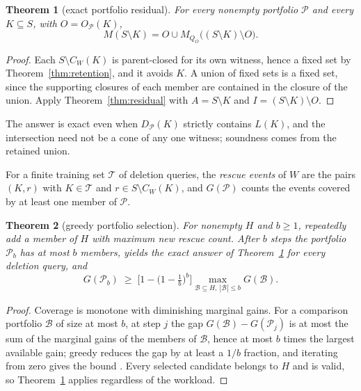 \documentclass[11pt,a4paper]{article}
\theoremstyle{plain}
\newtheorem{theorem}{Theorem}[section]
\theoremstyle{definition}
\theoremstyle{remark}
\begin{document}
\begin{theorem}[exact portfolio residual]\label{thm:portfolio}
For every nonempty portfolio $\mathcal P$ and every $K\subseteq S$, with $O=O_{\mathcal P}(K)$,
\[
M(S\setminus K)=O\cup M_{Q_O}\big((S\setminus K)\setminus O\big).
\]
\end{theorem}

\begin{proof}
Each $S\setminus C_W(K)$ is parent-closed for its own witness, hence a fixed set by Theorem~\ref{thm:retention}, and it avoids $K$. A union of fixed sets is a fixed set, since the supporting closures of each member are contained in the closure of the union. Apply Theorem~\ref{thm:residual} with $A=S\setminus K$ and $I=(S\setminus K)\setminus O$.
\end{proof}

The answer is exact even when $D_{\mathcal P}(K)$ strictly contains $L(K)$, and the intersection need not be a cone of any one witness; soundness comes from the retained union.

For a finite training set $\mathcal T$ of deletion queries, the \emph{rescue events} of $W$ are the pairs $(K,r)$ with $K\in\mathcal T$ and $r\in S\setminus C_W(K)$, and $G(\mathcal P)$ counts the events covered by at least one member of $\mathcal P$.

\begin{theorem}[greedy portfolio selection]\label{thm:greedy}
For nonempty $H$ and $b\ge1$, repeatedly add a member of $H$ with maximum new rescue count. After $b$ steps the portfolio $\mathcal P_b$ has at most $b$ members, yields the exact answer of Theorem~\ref{thm:portfolio} for every deletion query, and
\[
G(\mathcal P_b)\;\ge\;\Big[1-\big(1-\tfrac1b\big)^{b}\Big]\max_{\mathcal B\subseteq H,\ |\mathcal B|\le b}G(\mathcal B).
\]
\end{theorem}

\begin{proof}
Coverage is monotone with diminishing marginal gains. For a comparison portfolio $\mathcal B$ of size at most $b$, at step $j$ the gap $G(\mathcal B)-G(\mathcal P_j)$ is at most the sum of the marginal gains of the members of $\mathcal B$, hence at most $b$ times the largest available gain; greedy reduces the gap by at least a $1/b$ fraction, and iterating from zero gives the bound \citep{nemhauser1978}. Every selected candidate belongs to $H$ and is valid, so Theorem~\ref{thm:portfolio} applies regardless of the workload.
\end{proof}
\end{document}
